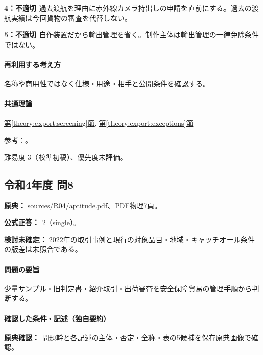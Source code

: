 \noindent\textbf{4：不適切} 過去渡航を理由に赤外線カメラ持出しの申請を直前にする。過去の渡航実績は今回貨物の審査を代替しない。\par

\noindent\textbf{5：不適切} 自作装置だから輸出管理を省く。制作主体は輸出管理の一律免除条件ではない。\par

\paragraph{再利用する考え方} 名称や商用性ではなく仕様・用途・相手と公開条件を確認する。

\paragraph{共通理論} \hyperref[theory:export:screening]{第\ref*{theory:export:screening}節}, \hyperref[theory:export:exceptions]{第\ref*{theory:export:exceptions}節}

\par 参考：\cite{export_overview,export_cases}。

\par 難易度 3（校準初稿）、優先度未評価。

\subsection{令和4年度 問8}
\label{q:r04-reg-apt-08}

\noindent\textbf{原典：} sources/R04/aptitude.pdf、PDF物理7頁。

\textbf{公式正答：} 2（single）。

\par\textbf{検討未確定：} 2022年の取引事例と現行の対象品目・地域・キャッチオール条件の版差は未照合である。

\paragraph{問題の要旨} 少量サンプル・旧判定書・紹介取引・出荷審査を安全保障貿易の管理手順から判断する。

\paragraph{確認した条件・記述（独自要約）}\mbox{}\par

\noindent\textbf{原典確認：} 問題幹と各記述の主体・否定・全称・表の5候補を保存原典画像で確認。\par

